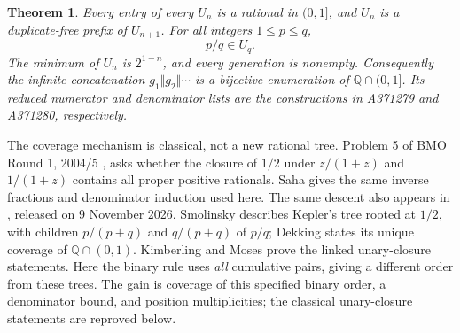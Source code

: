 \documentclass[11pt]{article}
\newtheorem{theorem}{Theorem}
\newcommand{\Q}{\mathbb{Q}}
\begin{document}
\begin{theorem}\label{thm:main}
Every entry of every $U_n$ is a rational in $(0,1]$, and $U_n$ is a
duplicate-free prefix of $U_{n+1}$. For all integers $1\le p\le q$,
\begin{equation}\label{eq:bound}
 p/q\in U_q.
\end{equation}
The minimum of $U_n$ is $2^{1-n}$, and every generation is nonempty.
Consequently the infinite concatenation
$g_1\Vert g_2\Vert\cdots$ is a bijective enumeration of $\Q\cap(0,1]$.
Its reduced numerator and denominator lists are the constructions in
A371279 and A371280, respectively.
\end{theorem}

The coverage mechanism is classical, not a new rational tree.
Problem 5 of BMO Round 1, 2004/5 \cite{bmo}, asks whether the closure
of $1/2$ under $z/(1+z)$ and $1/(1+z)$ contains all proper positive
rationals. Saha \cite[Exercise 6.4 and Solution 14, pp.~16--18]{saha}
gives the same inverse fractions and denominator induction used here.
The same descent also appears in
\cite[Theorem 6.2, p.~11]{recent}, released on 9 November 2026.
Smolinsky \cite[Sections 5--6]{smolinsky} describes Kepler's tree rooted
at $1/2$, with children $p/(p+q)$ and $q/(p+q)$ of $p/q$;
Dekking \cite[Section 2.1, p.~3]{dekking} states its unique coverage of
$\Q\cap(0,1)$. Kimberling and Moses
\cite[Theorem 3.3 and Example 3.5, pp.~139--140]{trees} prove the linked
unary-closure statements. Here the binary rule uses \emph{all} cumulative
pairs, giving a different order from these trees. The gain is coverage
of this specified binary order, a denominator bound, and position
multiplicities; the classical unary-closure statements are reproved below.
\end{document}

